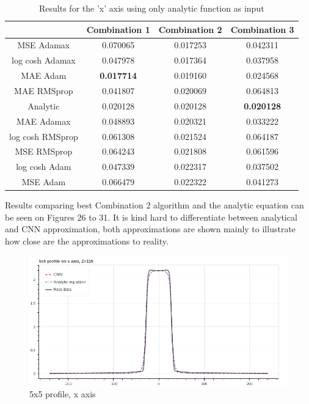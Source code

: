 \documentclass[openany]{article}
\begin{document}
\begin{table}[!h]
    \centering
    \begin{tabular}{c|c|c|c}
\textbf{}  & \textbf{Combination 1} &	\textbf{Combination 2} & \textbf{Combination 3}  \\
\hline
MSE Adamax & 0.070065 &	0.017253 & 0.042311 \\
log cosh Adamax & 0.047978 &	0.017364 & 0.037958 \\
MAE Adam & \textbf{0.017714} &	0.019160 & 0.024568 \\
MAE RMSprop & 0.041807 &	0.020069 & 0.064813 \\
Analytic & 0.020128 &	0.020128 & \textbf{0.020128} \\
MAE Adamax & 0.048893 &	0.020321 & 0.033222 \\ 
log cosh RMSprop & 0.061308 &	0.021524 & 0.064187 \\
MSE RMSprop & 0.064243 &	0.021808 & 0.061596 \\
log cosh Adam &	0.047339 & 0.022317 & 0.037502 \\
MSE Adam & 0.066479 &	0.022322 & 0.041273 \\
\hline 
    \end{tabular}
    \caption{Results for the 'x' axis using only analytic function as input}
    \label{tab:my_label}
\end{table}

\newpage 

Results comparing best Combination 2 algorithm and the analytic equation can be seen on Figures 26 to 31. It is kind hard to differentiate between analytical and CNN approximation, both approximations are shown mainly to illustrate how close are the approximations to reality.

\begin{figure}[!h]
    \centering
    \includegraphics[width=\textwidth]{5_5_x_axis.png}
    \caption{5x5 profile, x axis}
    \label{fig:my_label}
\end{figure}
\end{document}
